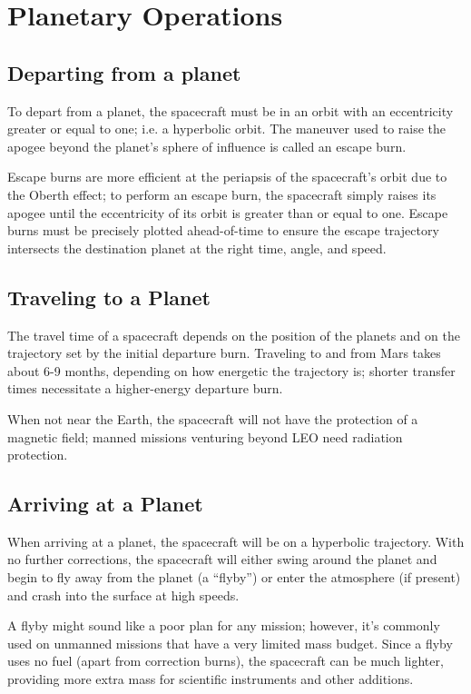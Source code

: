 
\chapter{Planetary Operations}

\section{Departing from a planet}

To depart from a planet, the spacecraft must be in an orbit with an
eccentricity greater or equal to one; i.e. a hyperbolic orbit. The
maneuver used to raise the apogee beyond the planet's sphere of
influence is called an escape burn.

Escape burns are more efficient at the periapsis of the spacecraft's
orbit due to the Oberth effect; to perform an escape burn, the
spacecraft simply raises its apogee until the eccentricity of its
orbit is greater than or equal to one. Escape burns must be precisely
plotted ahead-of-time to ensure the escape trajectory intersects the
destination planet at the right time, angle, and speed.

\section{Traveling to a Planet}

The travel time of a spacecraft depends on the position of the planets
and on the trajectory set by the initial departure burn. Traveling to
and from Mars takes about 6-9 months, depending on how energetic the
trajectory is; shorter transfer times necessitate a higher-energy
departure burn.

When not near the Earth, the spacecraft will not have the protection
of a magnetic field; manned missions venturing beyond LEO need
radiation protection.

\section{Arriving at a Planet}

When arriving at a planet, the spacecraft will be on a hyperbolic
trajectory. With no further corrections, the spacecraft will either
swing around the planet and begin to fly away from the planet (a
``flyby'') or enter the atmosphere (if present) and crash into the
surface at high speeds.

A flyby might sound like a poor plan for any mission; however, it's
commonly used on unmanned missions that have a very limited mass
budget. Since a flyby uses no fuel (apart from correction burns), the
spacecraft can be much lighter, providing more extra mass for
scientific instruments and other additions.

